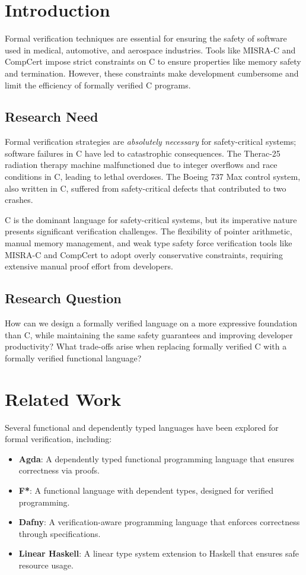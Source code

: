 \documentclass[conference]{IEEEtran}
\begin{document}
\section{Introduction}
Formal verification techniques are essential for ensuring the safety of software used in medical, automotive, and aerospace industries. Tools like MISRA-C and CompCert impose strict constraints on C to ensure properties like memory safety and termination. However, these constraints make development cumbersome and limit the efficiency of formally verified C programs. 

\subsection{Research Need}

Formal verification strategies are \emph{absolutely necessary} for safety-critical systems; software failures in C have led to catastrophic consequences. The Therac-25 radiation therapy machine malfunctioned due to integer overflows and race conditions in C, leading to lethal overdoses. The Boeing 737 Max control system, also written in C, suffered from safety-critical defects that contributed to two crashes.

C is the dominant language for safety-critical systems, but its imperative nature presents significant verification challenges. The flexibility of pointer arithmetic, manual memory management, and weak type safety force verification tools like MISRA-C and CompCert to adopt overly conservative constraints, requiring extensive manual proof effort from developers.

\subsection{Research Question}

How can we design a formally verified language on a more expressive foundation than C, while maintaining the same safety guarantees and improving developer productivity? What trade-offs arise when replacing formally verified C with a formally verified functional language?

\section{Related Work}
Several functional and dependently typed languages have been explored for formal verification, including:

\begin{itemize}
    \item \textbf{Agda}: A dependently typed functional programming language that ensures correctness via proofs.
    \item \textbf{F*}: A functional language with dependent types, designed for verified programming.
    \item \textbf{Dafny}: A verification-aware programming language that enforces correctness through specifications.
    \item \textbf{Linear Haskell}: A linear type system extension to Haskell that ensures safe resource usage.
\end{itemize}
\end{document}
